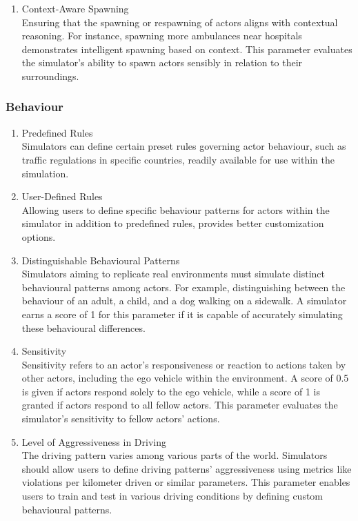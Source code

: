 \documentclass[12pt,twoside,a4paper,parskip]{scrbook} %
\begin{document}
\begin{enumerate}[label=\alph*.]
    \item Context-Aware Spawning \\
    Ensuring that the spawning or respawning of actors aligns with contextual reasoning. For instance, spawning more ambulances near hospitals demonstrates intelligent spawning based on context. This parameter evaluates the simulator's ability to spawn actors sensibly in relation to their surroundings.
    
\end{enumerate}
\subsubsection{Behaviour}
\begin{enumerate}[label=\alph*.]
    \item Predefined Rules\\
    Simulators can define certain preset rules governing actor behaviour, such as traffic regulations in specific countries, readily available for use within the simulation.
    
    \item User-Defined Rules\\
    Allowing users to define specific behaviour patterns for actors within the simulator in addition to predefined rules, provides better customization options.
    
    \item Distinguishable Behavioural Patterns\\
    Simulators aiming to replicate real environments must simulate distinct behavioural patterns among actors. For example, distinguishing between the behaviour of an adult, a child, and a dog walking on a sidewalk. A simulator earns a score of 1 for this parameter if it is capable of accurately simulating these behavioural differences.
    
    \item Sensitivity\\
    Sensitivity refers to an actor's responsiveness or reaction to actions taken by other actors, including the ego vehicle within the environment. A score of 0.5 is given if actors respond solely to the ego vehicle, while a score of 1 is granted if actors respond to all fellow actors. This parameter evaluates the simulator's sensitivity to fellow actors' actions.

    \item Level of Aggressiveness in Driving\\
    The driving pattern varies among various parts of the world. Simulators should allow users to define driving patterns' aggressiveness using metrics like violations per kilometer driven or similar parameters. This parameter enables users to train and test in various driving conditions by defining custom behavioural patterns.
    

\end{enumerate}
\end{document}
